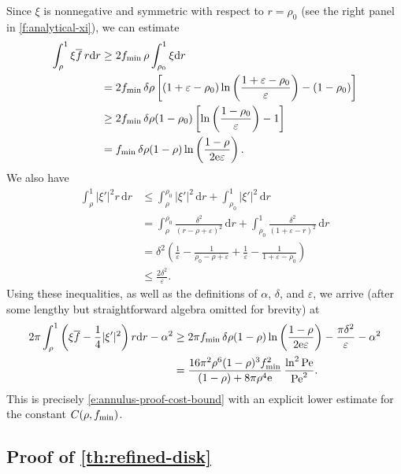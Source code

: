 \documentclass[a4paper, 10pt]{amsart}
\numberwithin{equation}{section}
\theoremstyle{plain}
\theoremstyle{definition}
\theoremstyle{remark}
\newcommand{\Pe}{\mathrm{Pe}}
\newcommand{\dr}{\mathrm{d} r}
\newcommand{\e}{{\rm e}}
\begin{document}
Since $\xi$ is nonnegative and symmetric with respect to $r=\rho_0$ (see the right panel in \cref{f:analytical-xi}), we can estimate
\begin{align*}
    \int_{\rho}^1 \xi \overline{f}\, r\dr
    & \geq 
    2  f_{\rm min} \, \rho
    \int_{\rho_0}^1 \xi \dr
    \\
    &=
    2f_{\rm min} \, \delta \rho \left[ (1+\varepsilon-\rho_0) \ln\left( \frac{1+\varepsilon-\rho_0}{\varepsilon} \right) - (1-\rho_0)\right]
    \\
    &\geq 
    2f_{\rm min} \, \delta \rho (1-\rho_0) \left[ \ln\left( \frac{1-\rho_0}{\varepsilon} \right)  - 1\right]
    \\
    &=
    f_{\rm min} \, \delta \rho (1 - \rho) 
     \ln\left(\frac{1-\rho}{2 \e \varepsilon}\right).
\end{align*}
We also have
\begin{align*}
    \int_{\rho}^{1}|\xi'|^{2}r\,\dr 
    &\leq
    \int_{\rho}^{\rho_0}|\xi'|^{2}\,\dr+\int_{\rho_0}^{1}|\xi'|^{2}\,\dr
    \\
    &=
    \int_{\rho}^{\rho_0}\frac{\delta^{2}}{(r-\rho+\varepsilon)^{2}}\,\dr
    +
    \int_{\rho_0}^{1}\frac{\delta^{2}}{(1+\varepsilon-r)^{2}}\,\dr
    \\
    &=
    \delta^{2}\left(\frac{1}{\varepsilon}-\frac{1}{\rho_0-\rho+\varepsilon}+\frac{1}{\varepsilon}-\frac{1}{1+\varepsilon-\rho_0}\right)
    \\
    &
    \leq
    \frac{2\delta^{2}}{\varepsilon}.
\end{align*}
Using these inequalities, as well as the definitions of $\alpha$, $\delta$, and $\varepsilon$, we arrive (after some lengthy but straightforward algebra omitted for brevity) at
\begin{align*}
    2\pi\int_{\rho}^1 \left( \xi \overline{f} - \frac14 |\xi'|^2 \right) r \dr - \alpha^2 
    &\geq 
    2\pi f_{\rm min} \, \delta \rho (1 - \rho) 
    \ln\left(\frac{1-\rho}{2 \e \varepsilon}\right)
    -
    \frac{\pi \delta^{2}}{\varepsilon}
    - \alpha^2
    \\
    &= \frac{16 \pi^2 \rho^6 (1-\rho)^3  f_{\rm min}^2}{(1-\rho) + 8\pi\rho^4 \e}
    \,
    \frac{\ln^2\Pe}{\Pe^2}.
\end{align*}
This is precisely \cref{e:annulus-proof-cost-bound} with an explicit lower estimate for the constant $C(\rho,f_{\rm min})$.


\subsection{Proof of \texorpdfstring{\cref{th:refined-disk}}{Theorem~\ref{th:refined-disk}}}\label{ss:proof-disk}
\end{document}
